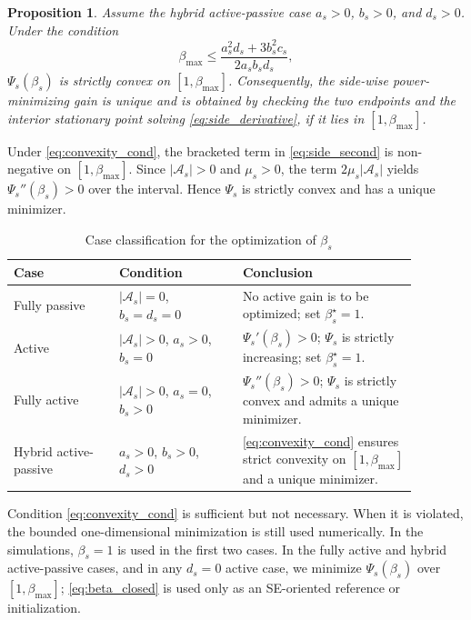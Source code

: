 \documentclass[journal]{IEEEtran}
\newtheorem{proposition}{Proposition}
\begin{document}
\begin{proposition}\label{prop:convexity}
Assume the hybrid active-passive case $a_s>0$, $b_s>0$, and $d_s>0$. Under the condition
\begin{equation}
\beta_{\max}
\le
\frac{a_s^2d_s+3b_s^2c_s}{2a_sb_sd_s},
\label{eq:convexity_cond}
\end{equation}
$\Psi_s(\beta_s)$ is strictly convex on $[1,\beta_{\max}]$. Consequently, the side-wise power-minimizing gain is unique and is obtained by checking the two endpoints and the interior stationary point solving \eqref{eq:side_derivative}, if it lies in $[1,\beta_{\max}]$.
\end{proposition}

\begin{IEEEproof}
Under \eqref{eq:convexity_cond}, the bracketed term in \eqref{eq:side_second} is non-negative on $[1,\beta_{\max}]$. Since $|\mathcal{A}_s|>0$ and $\mu_s>0$, the term $2\mu_s|\mathcal{A}_s|$ yields $\Psi_s''(\beta_s)>0$ over the interval. Hence $\Psi_s$ is strictly convex and has a unique minimizer.
\end{IEEEproof}

\begin{table}[t]
\centering
\caption{Case classification for the optimization of $\beta_s$}
\label{tab:beta_case_classification}
\small
\setlength{\tabcolsep}{4pt}
\begin{tabular}{@{}>{\raggedright\arraybackslash}p{0.23\linewidth} >{\raggedright\arraybackslash}p{0.27\linewidth} >{\raggedright\arraybackslash}p{0.38\linewidth}@{}}
\toprule
\textbf{Case} & \textbf{Condition} & \textbf{Conclusion} \\
\midrule
Fully passive & $|\mathcal{A}_s|=0$, $b_s=d_s=0$ & No active gain is to be optimized; set $\beta_s^\star=1$. \\[3pt]
Active & $|\mathcal{A}_s|>0$, $a_s>0$, $b_s=0$ & $\Psi_s'(\beta_s)>0$; $\Psi_s$ is strictly increasing; set $\beta_s^\star=1$. \\[3pt]
Fully active & $|\mathcal{A}_s|>0$, $a_s=0$, $b_s>0$ & $\Psi_s''(\beta_s)>0$; $\Psi_s$ is strictly convex and admits a unique minimizer. \\[3pt]
Hybrid active-passive & $a_s>0$, $b_s>0$, $d_s>0$ & \eqref{eq:convexity_cond} ensures strict convexity on $[1,\beta_{\max}]$ and a unique minimizer. \\
\bottomrule
\end{tabular}
\end{table}

Condition \eqref{eq:convexity_cond} is sufficient but not necessary. When it is violated, the bounded one-dimensional minimization is still used numerically. In the simulations, $\beta_s=1$ is used in the first two cases. In the fully active and hybrid active-passive cases, and in any $d_s=0$ active case, we minimize $\Psi_s(\beta_s)$ over $[1,\beta_{\max}]$; \eqref{eq:beta_closed} is used only as an SE-oriented reference or initialization.
\end{document}

